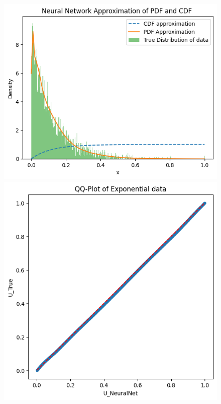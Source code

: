 \begin{figure}
\begin{minipage}{0.45\textwidth}
\begin{minipage}{0.48\textwidth}
        \end{minipage}
    \end{minipage}
    \hfill
    \begin{minipage}{0.45\textwidth}
        \centering
        \begin{minipage}{0.48\textwidth}
            \centering
            \includegraphics[width=\textwidth]{5ResultsDiscussion/pictures/MarginalTest/ExponentialHistogram.png}
        \end{minipage}
        \hfill
        \begin{minipage}{0.48\textwidth}
            \centering
            \includegraphics[width=\textwidth]{5ResultsDiscussion/pictures/MarginalTest/ExponentialQQ.png}

\end{minipage}
\end{minipage}
\end{figure}
